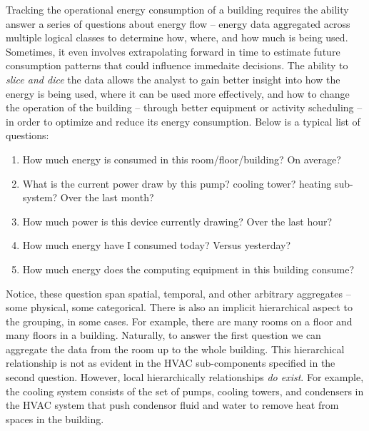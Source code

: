 Tracking the operational energy consumption of a building requires the ability answer a series of questions
about energy flow -- energy data aggregated across multiple logical classes to determine how, where, and how 
much is being used.  Sometimes, it even involves extrapolating forward in time to estimate 
future consumption patterns that could influence immedaite decisions.  The ability to \emph{slice and dice} 
the data allows the analyst
to gain better insight into how the energy is being used, where it can be used more effectively, and how
to change the operation of the building -- through better equipment or activity scheduling -- 
in order to optimize and reduce its energy consumption.
Below is a typical list of questions:

\begin{enumerate}
\item How much energy is consumed in this room/floor/building?  On average?
\item What is the current power draw by this pump? cooling tower? heating sub-system?  Over
		the last month?
\item How much power is this device currently drawing? Over the last hour?
\item How much energy have I consumed today?  Versus yesterday?
\item How much energy does the computing equipment in this building consume?
\end{enumerate}
\vspace{0.08in}

Notice, these question span spatial, temporal, and other arbitrary aggregates -- some physical, some
categorical.  There is also
an implicit hierarchical aspect to the grouping, in some cases.  For example, there are many
rooms on a floor and many floors in a building.  Naturally, to answer the first question we can
aggregate the data from the room up to the whole building.  This hierarchical relationship
is not as evident in the HVAC sub-components specified in the second question.  However,
local hierarchically relationships \emph{do exist}.  For example, the cooling system consists
of the set of pumps, cooling towers, and condensers in the HVAC system that push condensor
fluid and water to remove heat from spaces in the building.

